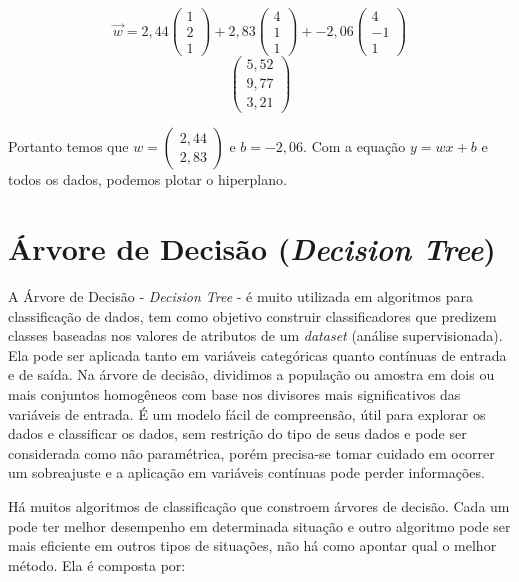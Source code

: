 \documentclass[
  openany]{book}
\begin{document}
\[\vec{w}=2,44\begin{pmatrix} 1\\2\\1\end{pmatrix}+
2,83\begin{pmatrix} 4\\1\\1\end{pmatrix}+
-2,06\begin{pmatrix} 4\\-1\\1\end{pmatrix}\]
\[\begin{pmatrix}5,52\\9,77\\3,21\end{pmatrix}\]

Portanto temos que \(w=\begin{pmatrix} 2,44\\2,83\end{pmatrix}\) e \(b=-2,06\). Com a equação \(y=wx+b\) e todos os dados, podemos plotar o hiperplano.

\hypertarget{decisiontree}{%
\section{\texorpdfstring{Árvore de Decisão (\emph{Decision Tree})}{Árvore de Decisão (Decision Tree)}}\label{decisiontree}}

A Árvore de Decisão - \emph{Decision Tree} - é muito utilizada em algoritmos para classificação de dados, tem como objetivo construir classificadores que predizem classes baseadas nos valores de atributos de um \emph{dataset} (análise supervisionada). Ela pode ser aplicada tanto em variáveis categóricas quanto contínuas de entrada e de saída. Na árvore de decisão, dividimos a população ou amostra em dois ou mais conjuntos homogêneos com base nos divisores mais significativos das variáveis de entrada. É um modelo fácil de compreensão, útil para explorar os dados e classificar os dados, sem restrição do tipo de seus dados e pode ser considerada como não paramétrica, porém precisa-se tomar cuidado em ocorrer um sobreajuste e a aplicação em variáveis contínuas pode perder informações.

Há muitos algoritmos de classificação que constroem árvores de decisão. Cada um pode ter melhor desempenho em determinada situação e outro algoritmo pode ser mais eficiente em outros tipos de situações, não há como apontar qual o melhor método. Ela é composta por:
\end{document}
